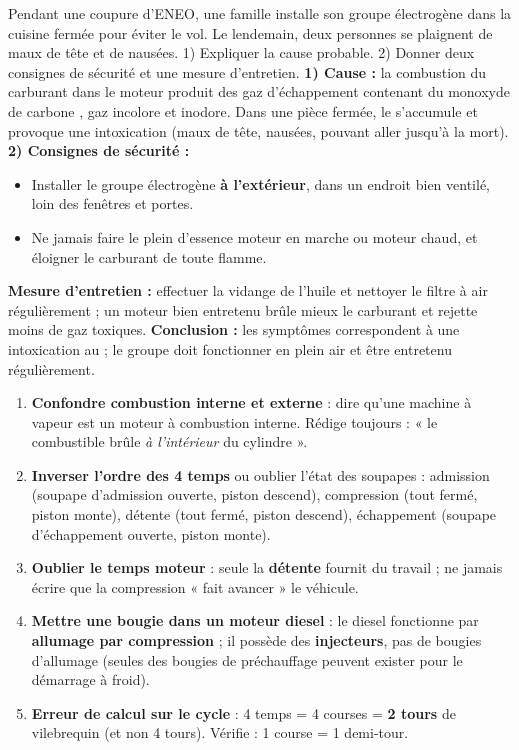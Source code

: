 \documentclass[11pt]{article}
\newcommand{\cle}[1]{{\popxbold\color{popdark}#1}}
\begin{document}
\begin{exoresolu}
Pendant une coupure d'ENEO, une famille installe son groupe électrogène dans la cuisine fermée pour éviter le vol. Le lendemain, deux personnes se plaignent de maux de tête et de nausées. 1) Expliquer la cause probable. 2) Donner deux consignes de sécurité et une mesure d'entretien.
\tcblower
\textbf{1) Cause :} la combustion du carburant dans le moteur produit des gaz d'échappement contenant du \cle{monoxyde de carbone} , gaz incolore et inodore. Dans une pièce fermée, le  s'accumule et provoque une intoxication (maux de tête, nausées, pouvant aller jusqu'à la mort).
\textbf{2) Consignes de sécurité :}
\begin{itemize}
\item Installer le groupe électrogène \textbf{à l'extérieur}, dans un endroit bien ventilé, loin des fenêtres et portes.
\item Ne jamais faire le plein d'essence moteur en marche ou moteur chaud, et éloigner le carburant de toute flamme.
\end{itemize}
\textbf{Mesure d'entretien :} effectuer la vidange de l'huile et nettoyer le filtre à air régulièrement ; un moteur bien entretenu brûle mieux le carburant et rejette moins de gaz toxiques.
\textbf{Conclusion :} les symptômes correspondent à une intoxication au  ; le groupe doit fonctionner en plein air et être entretenu régulièrement.
\end{exoresolu}

\begin{attention}
\begin{enumerate}
\item \textbf{Confondre combustion interne et externe} : dire qu'une machine à vapeur est un moteur à combustion interne. Rédige toujours : « le combustible brûle \emph{à l'intérieur} du cylindre ».
\item \textbf{Inverser l'ordre des 4 temps} ou oublier l'état des soupapes : admission (soupape d'admission ouverte, piston descend), compression (tout fermé, piston monte), détente (tout fermé, piston descend), échappement (soupape d'échappement ouverte, piston monte).
\item \textbf{Oublier le temps moteur} : seule la \textbf{détente} fournit du travail ; ne jamais écrire que la compression « fait avancer » le véhicule.
\item \textbf{Mettre une bougie dans un moteur diesel} : le diesel fonctionne par \textbf{allumage par compression} ; il possède des \textbf{injecteurs}, pas de bougies d'allumage (seules des bougies de préchauffage peuvent exister pour le démarrage à froid).
\item \textbf{Erreur de calcul sur le cycle} : 4 temps = 4 courses = \textbf{2 tours} de vilebrequin (et non 4 tours). Vérifie : 1 course = 1 demi-tour.
\end{enumerate}
\end{attention}
\end{document}
